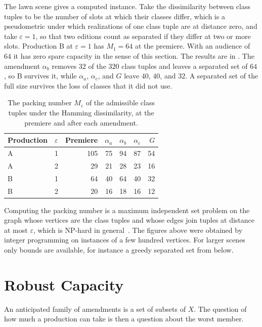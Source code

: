 \documentclass[11pt,twoside,openright]{book}
\theoremstyle{plain}
\theoremstyle{definition}
\theoremstyle{remark}
\begin{document}
The lawn scene gives a computed instance. Take the dissimilarity between class tuples to be the number of slots at which their classes differ, which is a pseudometric under which realizations of one class tuple are at distance zero, and take $\varepsilon=1$, so that two editions count as separated if they differ at two or more slots. Production B at $\varepsilon=1$ has $M_1=64$ at the premiere. With an audience of $64$ it has zero spare capacity in the sense of this section. The results are in . The amendment $\alpha_b$ removes $32$ of the $320$ class tuples and leaves a separated set of $64$, so B survives it, while $\alpha_a$, $\alpha_c$, and $G$ leave $40$, $40$, and $32$. A separated set of the full size survives the loss of classes that it did not use.

\begin{table}[ht]
\centering
\begin{tabular}{@{}llrrrrr@{}}
\toprule
Production & $\varepsilon$ & Premiere & $\alpha_a$ & $\alpha_b$ & $\alpha_c$ & $G$\\
\midrule
A & 1 & 105 & 75 & 94 & 87 & 54\\
A & 2 & 29 & 21 & 28 & 23 & 16\\
B & 1 & 64 & 40 & 64 & 40 & 32\\
B & 2 & 20 & 16 & 18 & 16 & 12\\
\bottomrule
\end{tabular}
\caption{The packing number $M_\varepsilon$ of the admissible class tuples under the Hamming dissimilarity, at the premiere and after each amendment.}\label{tab:threshold}
\end{table}

Computing the packing number is a maximum independent set problem on the graph whose vertices are the class tuples and whose edges join tuples at distance at most $\varepsilon$, which is NP-hard in general~\cite{garey1979}. The figures above were obtained by integer programming on instances of a few hundred vertices. For larger scenes only bounds are available, for instance a greedy separated set from below.

\section{Robust Capacity}\label{sec:robust}

An anticipated family of amendments is a set of subsets of $X$. The question of how much a production can take is then a question about the worst member.
\end{document}
